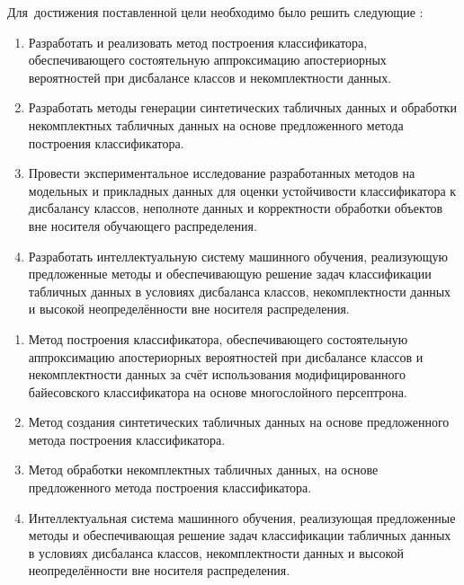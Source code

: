 Для~достижения поставленной цели необходимо было решить следующие {\tasks}:
\begin{enumerate}[beginpenalty=10000] %
  \item Разработать и реализовать метод построения классификатора, обеспечивающего состоятельную аппроксимацию апостериорных вероятностей при дисбалансе классов и некомплектности данных.

  \item Разработать методы генерации синтетических табличных данных и обработки некомплектных табличных данных на основе предложенного метода построения классификатора.

  \item Провести экспериментальное исследование разработанных методов на модельных и прикладных данных для оценки устойчивости классификатора к дисбалансу классов, неполноте данных и корректности обработки объектов вне носителя обучающего распределения.

  \item Разработать интеллектуальную систему машинного обучения, реализующую предложенные методы и обеспечивающую решение задач классификации табличных данных в условиях дисбаланса классов, некомплектности данных и высокой неопределённости вне носителя распределения.
\end{enumerate}

{}
\begin{enumerate}[beginpenalty=10000] %
  \item Метод построения классификатора, обеспечивающего состоятельную аппроксимацию апостериорных вероятностей при дисбалансе классов и некомплектности данных за счёт использования модифицированного байесовского классификатора на основе многослойного персептрона.
  
  \item Метод создания синтетических табличных данных на основе предложенного метода построения классификатора.

  \item Метод обработки некомплектных табличных данных, на основе предложенного метода построения классификатора.

  \item Интеллектуальная система машинного обучения, реализующая предложенные методы и обеспечивающая решение задач классификации табличных данных в условиях дисбаланса классов, некомплектности данных и высокой неопределённости вне носителя распределения.
\end{enumerate}

